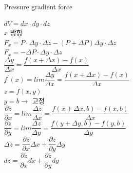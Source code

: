 \documentclass[11pt]{beamer}
\begin{document}
\begin{frame}{Pressure gradient force}\footnotesize

	$ dV = dx \cdot dy \cdot dz $\\
	
	$x$ 방향 \\
	
	$ F_{x} = P \cdot \Delta y \cdot \Delta z - \left( P + \Delta P \right) \Delta y \cdot \Delta z$\\
	
	$ F_{x} = - \Delta P \cdot \Delta y \cdot \Delta z $\\
	
	$ \dfrac { \Delta y}{\Delta x } = \dfrac {f\left(x + \Delta x \right) - f\left(x \right)}{ \Delta x}$\\
	
	$f^{\prime} \left(x \right) = lim \dfrac { \Delta y}{\Delta x } 
	= \dfrac {f\left(x + \Delta x \right) - f\left(x \right)}{ \Delta x}$\\
	
	$z = f \left( x, y \right) $ \\
	$y = b \rightarrow $ 고정 \\
	
	$\dfrac{\partial z}{\partial x} = lim \dfrac { \Delta z}{\Delta x } 
	= \dfrac {f\left(x + \Delta x, b \right) - f\left(x, b \right)}{ \Delta x}$\\
	
	$\dfrac{\partial z}{\partial y} = lim \dfrac { \Delta z}{\Delta y } 
	= \dfrac {f\left(y + \Delta y, b \right) - f\left(y, b \right)}{ \Delta y}$\\
	
	$ \Delta z = \dfrac{\partial z}{\partial x} \Delta x + \dfrac{\partial z}{\partial y} \Delta y $\\
	
	$ dz = \dfrac{\partial z}{\partial x} dx + \dfrac{\partial z}{\partial y} dy $\\

\end{frame}
\end{document}
